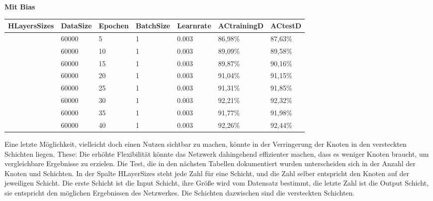 \documentclass[12pt]{article}
\begin{document}
\begin{table}[H]
    \centering
    \textbf{Mit Bias}
    \begin{tabular}{|l|l|l|l|l|l|l|}
    \hline
        HLayersSizes & DataSize & Epochen & BatchSize & Learnrate & ACtrainingD & ACtestD \\ \hline
        [784, 100, 10] & 60000 & 5 & 1 & 0.003 & 86,98\% & 87,63\% \\ \hline
        [784, 100, 10] & 60000 & 10 & 1 & 0.003 & 89,09\% & 89,58\% \\ \hline
        [784, 100, 10] & 60000 & 15 & 1 & 0.003 & 89,87\% & 90,16\% \\ \hline
        [784, 100, 10] & 60000 & 20 & 1 & 0.003 & 91,04\% & 91,15\% \\ \hline
        [784, 100, 10] & 60000 & 25 & 1 & 0.003 & 91,31\% & 91,85\% \\ \hline
        [784, 100, 10] & 60000 & 30 & 1 & 0.003 & 92,21\% & 92,32\% \\ \hline
        [784, 100, 10] & 60000 & 35 & 1 & 0.003 & 91,77\% & 91,98\% \\ \hline
        [784, 100, 10] & 60000 & 40 & 1 & 0.003 & 92,26\% & 92,44\% \\ \hline
    \end{tabular}
\end{table}
Eine letzte Möglichkeit, vielleicht doch einen Nutzen sichtbar zu machen, könnte in der Verringerung der Knoten in den versteckten Schichten liegen. 
These: Die erhöhte Flexibilität könnte das Netzwerk dahingehend effizienter machen, dass es weniger Knoten braucht, um vergleichbare Ergebnisse zu erzielen.
Die Test, die in den nächsten Tabellen dokumentiert wurden unterscheiden sich in der Anzahl der Knoten und Schichten. In der Spalte HLayerSizes steht jede Zahl für eine Schicht, und die Zahl selber entspricht den Knoten auf der jeweiligen Schicht. Die erste Schicht ist die Input Schicht, ihre Größe wird vom Datensatz bestimmt, die letzte Zahl ist die Output Schicht, sie entspricht den möglichen Ergebnissen des Netzwerkes. Die Schichten dazwischen sind die versteckten Schichten.
\end{document}
